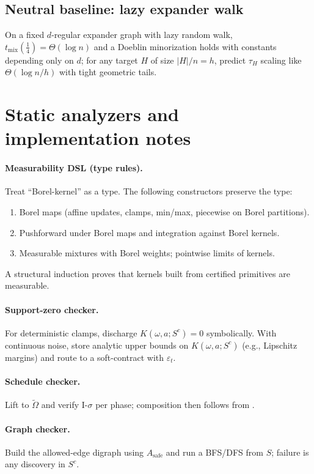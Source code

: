 \documentclass[11pt]{article}
\theoremstyle{plain}
\theoremstyle{definition}
\theoremstyle{remark}
\newcommand{\mix}{\mathrm{mix}}
\begin{document}
\subsection{Neutral baseline: lazy expander walk}

On a fixed $d$-regular expander graph with lazy random walk, $t_{\mix}(\tfrac14)=\Theta(\log n)$ and a Doeblin minorization holds with constants depending only on $d$; for any target $H$ of size $|H|/n=h$,  predict $\tau_H$ scaling like $\Theta(\log n / h)$ with tight geometric tails.

\section{Static analyzers and implementation notes}

\paragraph{Measurability DSL (type rules).}
Treat ``Borel-kernel'' as a type. The following constructors preserve the type:
\begin{enumerate}[leftmargin=1.3em,label=(\roman*)]
\item Borel maps (affine updates, clamps, min/max, piecewise on Borel partitions).
\item Pushforward under Borel maps and integration against Borel kernels.
\item Measurable mixtures with Borel weights; pointwise limits of kernels.
\end{enumerate}
A structural induction proves that kernels built from certified primitives are measurable.

\paragraph{Support-zero checker.}
For deterministic clamps, discharge $K(\omega,a;S^c)=0$ symbolically. With continuous noise, store analytic upper bounds on $K(\omega,a;S^c)$ (e.g., Lipschitz margins) and route to a soft-contract with $\varepsilon_t$.

\paragraph{Schedule checker.}
Lift to $\tilde\Omega$ and verify I-$\sigma$ per phase; composition then follows from .

\paragraph{Graph checker.}
Build the allowed-edge digraph using $A_{\mathrm{safe}}$ and run a BFS/DFS from $S$; failure is any discovery in $S^c$.
\end{document}
